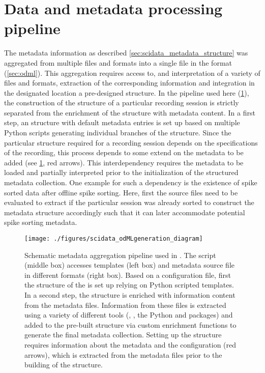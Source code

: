 \section{Data and metadata processing pipeline}
\label{sec:r2g_preprocessing_pipeline}
The metadata information as described \cref{sec:scidata_metadata_structure} was aggregated from multiple files and formats into a single file in the  format (\cref{sec:odml}). This aggregation requires access to, and interpretation of a variety of files and formats, extraction of the corresponding information and integration in the designated location a pre-designed  structure. In the pipeline used here (\cref{fig:scidata_metadata_pipeline}), the construction of the  structure of a particular recording session is strictly separated from the enrichment of the structure with metadata content. In a first step, an  structure with default metadata entries is set up based on multiple Python scripts generating individual branches of the  structure. Since the particular structure required for a recording session depends on the specifications of the recording, this process depends to some extend on the metadata to be added (see \cref{fig:scidata_metadata_pipeline}, red arrows). This interdependency requires the metadata to be loaded and partially interpreted prior to the initialization of the structured metadata collection. One example for such a dependency is the existence of spike sorted data after offline spike sorting. Here, first the source files need to be evaluated to extract if the particular session was already sorted to construct the metadata structure accordingly such that it can later accommodate potential spike sorting metadata.

\begin{figure}[hp]
 \texttt{[image: ./figures/scidata\_odMLgeneration\_diagram]}
 \caption[Schematic metadata aggregation pipeline used in \citet{Brochier_2018}]{Schematic metadata aggregation pipeline used in \citet{Brochier_2018}. The  script (middle box) accesses  templates (left box) and metadata source file in different formats (right box). Based on a configuration file, first the structure of the  is set up relying on Python scripted  templates. In a second step, the structure is enriched with information content from the metadata files. Information from these files is extracted using a variety of different tools (, , the Python  and  packages) and added to the pre-built  structure via custom enrichment functions to generate the final metadata collection. Setting up the  structure requires information about the metadata and the configuration (red arrows), which is extracted from the metadata files prior to the building of the  structure.}
 \label{fig:scidata_metadata_pipeline}
\end{figure}

